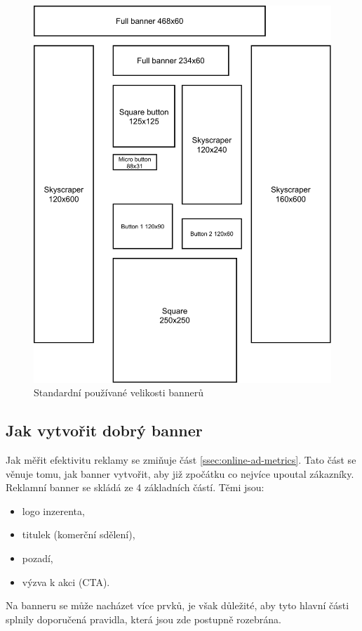     \begin{figure}[h]
        \centering
        \includegraphics[width=1\textwidth]{Figures/banner-sizes.pdf}
        \caption[Velikosti bannerů]{Standardní používané velikosti bannerů}
        \label{fig:banner-sizes}
    \end{figure}

    \subsection{Jak vytvořit dobrý banner}
    Jak měřit efektivitu reklamy se zmiňuje část \ref{ssec:online-ad-metrics}. Tato část se věnuje tomu, jak banner vytvořit,
    aby již zpočátku co nejvíce upoutal zákazníky. \cite{banner:design}
    Reklamní banner se skládá ze 4 základních částí. Těmi jsou:
    \begin{itemize}
    \item logo inzerenta,
    \item titulek (komerční sdělení),
    \item pozadí,
    \item výzva k akci (CTA).
    \end{itemize}
    Na banneru se může nacházet více prvků, je však důležité, aby tyto hlavní části splnily doporučená pravidla, která jsou zde postupně rozebrána.

